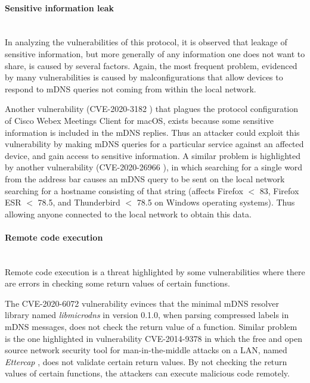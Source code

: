 \documentclass[fleqn, 11pt]{SelfArx} %
\begin{document}
\paragraph{Sensitive information leak}\mbox{}\\
In analyzing the vulnerabilities of this protocol, it is observed that leakage of sensitive information, but more generally of any information one does not want to share, is caused by several factors. Again, the most frequent problem, evidenced by many vulnerabilities is caused by malconfigurations that allow devices to respond to mDNS queries not coming from within the local network. 

Another vulnerability (CVE-2020-3182 \cite{CVE-2020-3182}) that plagues the protocol configuration of Cisco Webex Meetings Client for macOS, exists because some sensitive information is included in the mDNS replies. Thus an attacker could exploit this vulnerability by making mDNS queries for a particular service against an affected device, and gain access to sensitive information. A similar problem is highlighted by another vulnerability (CVE-2020-26966 \cite{CVE-2020-26966}), in which searching for a single word from the address bar causes an mDNS query to be sent on the local network searching for a hostname consisting of that string (affects Firefox $<$ 83, Firefox ESR $<$ 78.5, and Thunderbird $<$ 78.5 on Windows operating systems). Thus allowing anyone connected to the local network to obtain this data.
\paragraph{Remote code execution}\mbox{}\\
Remote code execution is a threat highlighted by some vulnerabilities where there are errors in checking some return values of certain functions. 

The CVE-2020-6072 {\cite{CVE-2020-6072}} vulnerability evinces that the minimal mDNS resolver library named \textit{libmicrodns} \cite{libmicrodns} in version 0.1.0, when parsing compressed labels in mDNS messages, does not check the return value of a function. Similar problem is the one highlighted in vulnerability CVE-2014-9378 \cite{CVE-2014-9378} in which the free and open source network security tool for man-in-the-middle attacks on a LAN, named \textit{Ettercap} \cite{Ettercap}, does not validate certain return values.
\newline
By not checking the return values of certain functions, the attackers can execute malicious code remotely. 
\end{document}
